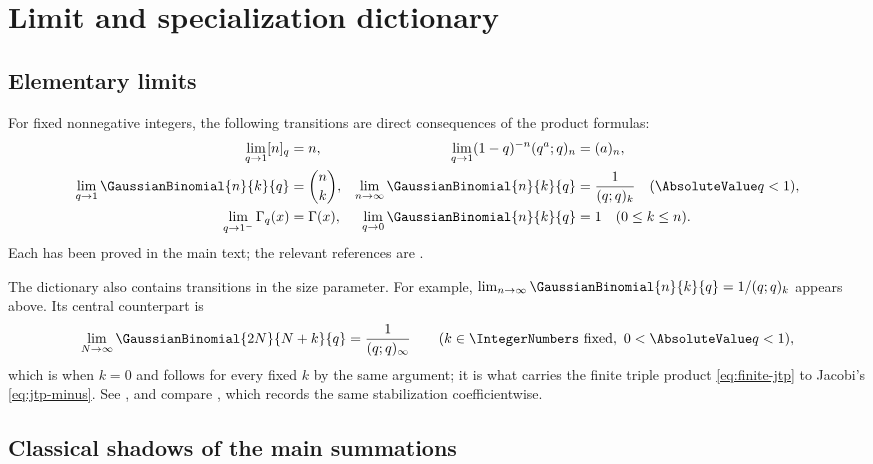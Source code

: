 \documentclass[11pt,a4paper,oneside,openany]{book}
\theoremstyle{definition}
\theoremstyle{remark}
\begin{document}
\chapter{Limit and specialization dictionary}\label{app:limits}

\section{Elementary limits}

For fixed nonnegative integers, the following transitions are direct consequences of the product formulas:
\begin{align*}
 \lim_{q\to1}[n]_q&=n,
 &\lim_{q\to1}(1-q)^{-n}(q^a;q)_n&=(a)_n,\\
 \lim_{q\to1}\GaussianBinomial{n}{k}{q}&=\binom nk,
 &\lim_{n\to\infty}\GaussianBinomial{n}{k}{q}&=\frac1{(q;q)_k}\quad(\AbsoluteValue q<1),\\
 \lim_{q\to1^-}\Gamma_q(x)&=\Gamma(x),
 &\lim_{q\to0}\GaussianBinomial{n}{k}{q}&=1\quad(0\le k\le n).
\end{align*}
Each has been proved in the main text; the relevant references are .

\medskip
The dictionary also contains transitions in the size parameter.  For example,
$\lim_{n\to\infty}\GaussianBinomial{n}{k}{q}=1/(q;q)_k$ appears above.  Its central counterpart is
\[
 \lim_{N\to\infty}\GaussianBinomial{2N}{N+k}{q}=\frac1{(q;q)_\infty}
 \qquad(k\in\IntegerNumbers\text{ fixed},\ 0<\AbsoluteValue q<1),
\]
which is  when $k=0$ and follows for every fixed $k$
by the same argument; it is what carries the finite triple product
\eqref{eq:finite-jtp} to Jacobi's \eqref{eq:jtp-minus}.  See
, and compare
, which records the same stabilization
coefficientwise.

\section{Classical shadows of the main summations}
\end{document}
